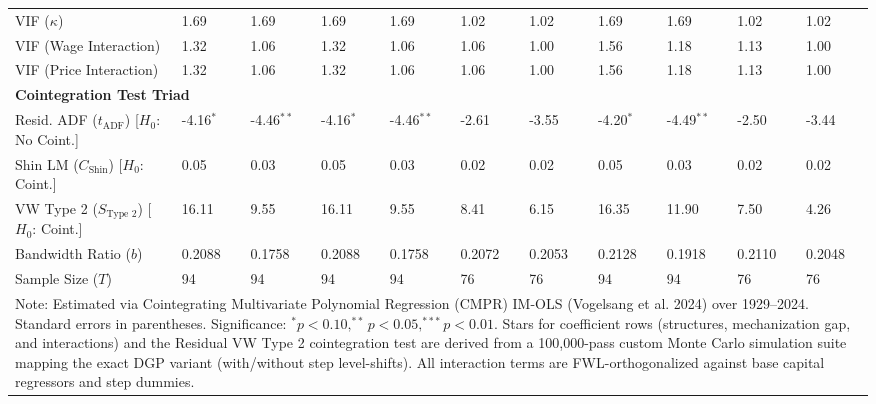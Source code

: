 \begin{table}[H]
\begin{tabular}{p{3.5cm}p{1.0cm}p{1.0cm}p{1.0cm}p{1.0cm}p{1.0cm}p{1.0cm}p{1.0cm}p{1.0cm}p{1.0cm}p{1.0cm}}
VIF ($\kappa$) & 1.69 & 1.69 & 1.69 & 1.69 & 1.02 & 1.02 & 1.69 & 1.69 & 1.02 & 1.02 \\
VIF (Wage Interaction) & 1.32 & 1.06 & 1.32 & 1.06 & 1.06 & 1.00 & 1.56 & 1.18 & 1.13 & 1.00 \\
VIF (Price Interaction) & 1.32 & 1.06 & 1.32 & 1.06 & 1.06 & 1.00 & 1.56 & 1.18 & 1.13 & 1.00 \\
\midrule
\multicolumn{11}{l}{\textbf{Cointegration Test Triad}} \\
Resid. ADF ($t_{\text{ADF}}$) [$H_0$: No Coint.] & -4.16$^{*}$ & -4.46$^{**}$ & -4.16$^{*}$ & -4.46$^{**}$ & -2.61 & -3.55 & -4.20$^{*}$ & -4.49$^{**}$ & -2.50 & -3.44 \\
Shin LM ($C_{\text{Shin}}$) [$H_0$: Coint.] & 0.05 & 0.03 & 0.05 & 0.03 & 0.02 & 0.02 & 0.05 & 0.03 & 0.02 & 0.02 \\
VW Type 2 ($S_{\text{Type 2}}$) [$H_0$: Coint.] & 16.11 & 9.55 & 16.11 & 9.55 & 8.41 & 6.15 & 16.35 & 11.90 & 7.50 & 4.26 \\
\midrule
Bandwidth Ratio ($b$) & 0.2088 & 0.1758 & 0.2088 & 0.1758 & 0.2072 & 0.2053 & 0.2128 & 0.1918 & 0.2110 & 0.2048 \\
Sample Size ($T$) & 94 & 94 & 94 & 94 & 76 & 76 & 94 & 94 & 76 & 76 \\
\bottomrule
\multicolumn{11}{p{15cm}}{\footnotesize Note: Estimated via Cointegrating Multivariate Polynomial Regression (CMPR) IM-OLS (Vogelsang et al. 2024) over 1929--2024. Standard errors in parentheses. Significance: $^* p < 0.10, ^{**} p < 0.05, ^{***} p < 0.01$. Stars for coefficient rows (structures, mechanization gap, and interactions) and the Residual VW Type 2 cointegration test are derived from a 100,000-pass custom Monte Carlo simulation suite mapping the exact DGP variant (with/without step level-shifts). All interaction terms are FWL-orthogonalized against base capital regressors and step dummies.}
\end{tabular}
\end{table}
